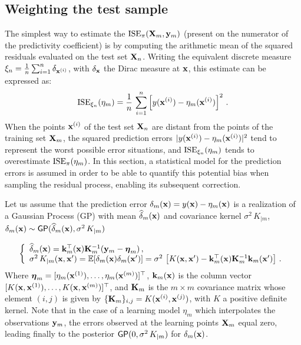 \subsection{Weighting the test sample}\label{sec:weighting}

The simplest way to estimate the $\mathrm{ISE}_\pi({\bf X}_m,{\bf y}_m)$ (present on the numerator of the predictivity coefficient) is by computing the arithmetic mean of the squared residuals evaluated on the test set ${\bf X}_n$. 
Writing the equivalent discrete measure $\xi_n = \frac1n \sum_{i=1}^n \delta_{{\bf x}^{(i)}}$, with $\delta_{{\bf x}}$ the Dirac measure at ${\bf x}$, this estimate can be expressed as:
$$
\mathrm{ISE}_{\xi_n}(\eta_m) = \frac1n\, \sum_{i=1}^n \left[ y({\bf x}^{(i)})-\eta_m({\bf x}^{(i)})\right]^2 \,.
$$
When the points ${\bf x}^{(i)}$ of the test set ${\bf X}_n$ are distant from the points of the training set ${\bf X}_m$, the squared prediction errors $|y({\bf x}^{(i)})-\eta_m({\bf x}^{(i)})|^2$ tend to represent the worst possible error situations, and $\mathrm{ISE}_{\xi_n}(\eta_m)$ tends to overestimate $\mathrm{ISE}_\pi(\eta_m)$. 
In this section, a statistical model for the prediction errors is assumed in order to be able to quantify this potential bias when sampling the residual process, enabling its subsequent correction. 

Let us assume that the prediction error $\delta_m({\bf x})=y({\bf x})-\eta_m({\bf x})$ is a realization of a Gaussian Process (GP) with mean $\widehat\delta_m({\bf x})$ and covariance kernel $\sigma^2\,K_{|m}$,
$\delta_m({\bf x})\sim\mathsf{GP}(\widehat\delta_m({\bf x}),\sigma^2\,K_{|m})$ 

\begin{equation}
    \left\{
    \begin{array}{ll}
        \widehat\delta_m({\bf x})=\mathbf{k}_m^\top({\bf x})\mathbf{K}_m^{-1}({\bf y}_m-\boldsymbol{\eta}_m)\, ,\\
        \sigma^2\, K_{|m}({\bf x},{\bf x}')=\mathbb{E}[\delta_m({\bf x})\delta_m({\bf x}')]=\sigma^2\,\left[K({\bf x},{\bf x}')-\mathbf{k}_m^\top({\bf x})\mathbf{K}_m^{-1}\mathbf{k}_m({\bf x}')\right]\,.
    \end{array}
\right.
\end{equation}
Where 
$\boldsymbol{\eta}_m=[\eta_m({\bf x}^{(1)}),\ldots,\eta_m({\bf x}^{(m)})]^\top$, 
$\mathbf{k}_m({\bf x})$ is the column vector $[K({\bf x},{\bf x}^{(1)}),\ldots,K({\bf x},{\bf x}^{(m)})]^\top$,  
and $\mathbf{K}_m$ is the $m\times m$ covariance matrix whose element $(i,j)$ is given by $\{\mathbf{K}_m\}_{i,j}=K({\bf x}^{(i)},{\bf x}^{(j)})$, with $K$ a positive definite kernel. 
Note that in the case of a learning model $\eta_m$ which interpolates the observations ${\bf y}_m$, the errors observed at the learning points ${\bf X}_m$ equal zero, leading finally to the posterior $\mathsf{GP}(0,\sigma^2\,K_{|m})$ for $\delta_m({\bf x})$. 


